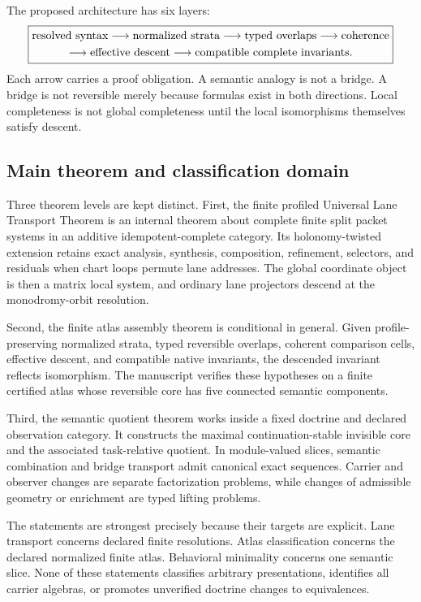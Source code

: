 \documentclass[11pt]{article}
\theoremstyle{definition}
\theoremstyle{remark}
\begin{document}
The proposed architecture has six layers:
\[
\boxed{
\begin{gathered}
\text{resolved syntax}\longrightarrow\text{normalized strata}
\longrightarrow\text{typed overlaps}\longrightarrow\text{coherence}\cr
\longrightarrow\text{effective descent}
\longrightarrow\text{compatible complete invariants}.
\end{gathered}}
\]
Each arrow carries a proof obligation. A semantic analogy is not a bridge. A bridge is not reversible merely because formulas exist in both directions. Local completeness is not global completeness until the local isomorphisms themselves satisfy descent.

\subsection{Main theorem and classification domain}

Three theorem levels are kept distinct. First, the finite profiled Universal Lane Transport Theorem is an internal theorem about complete finite split packet systems in an additive idempotent-complete category. Its holonomy-twisted extension retains exact analysis, synthesis, composition, refinement, selectors, and residuals when chart loops permute lane addresses. The global coordinate object is then a matrix local system, and ordinary lane projectors descend at the monodromy-orbit resolution.

Second, the finite atlas assembly theorem is conditional in general. Given profile-preserving normalized strata, typed reversible overlaps, coherent comparison cells, effective descent, and compatible native invariants, the descended invariant reflects isomorphism. The manuscript verifies these hypotheses on a finite certified atlas whose reversible core has five connected semantic components.

Third, the semantic quotient theorem works inside a fixed doctrine and declared observation category. It constructs the maximal continuation-stable invisible core and the associated task-relative quotient. In module-valued slices, semantic combination and bridge transport admit canonical exact sequences. Carrier and observer changes are separate factorization problems, while changes of admissible geometry or enrichment are typed lifting problems.

The statements are strongest precisely because their targets are explicit. Lane transport concerns declared finite resolutions. Atlas classification concerns the declared normalized finite atlas. Behavioral minimality concerns one semantic slice. None of these statements classifies arbitrary presentations, identifies all carrier algebras, or promotes unverified doctrine changes to equivalences.
\end{document}
